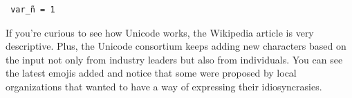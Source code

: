 \begin{verbatim}
 var_ñ = 1
\end{verbatim}

If you're curious to see how Unicode works, the Wikipedia article is very descriptive. Plus, the Unicode consortium keeps adding new characters based on the input not only from industry leaders but also from individuals. You can see the latest emojis added and notice that some were proposed by local organizations that wanted to have a way of expressing their idiosyncrasies.
